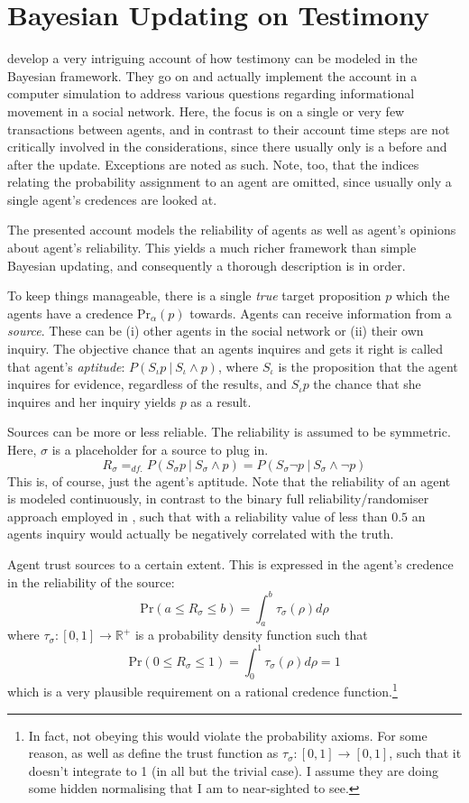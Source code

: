 \documentclass[11pt, a4paper]{scrartcl}
\newcommand{\Ss}{S_{\sigma}}
\newcommand{\given}[1][]{\:#1\vert\:}
\renewcommand{\Pr}{\text{Pr}}
\renewcommand{\i}[1]{\emph{#1}}
\begin{document}
\section{Bayesian Updating on Testimony}

\textcite{Olsson2013} develop a very intriguing account of how testimony can be modeled in the Bayesian framework. They go on and actually implement the account in a computer simulation to address various questions regarding informational movement in a social network. Here, the focus is on a single or very few transactions between agents, and in contrast to their account time steps are not critically involved in the considerations, since there usually only is a before and after the update. Exceptions are noted as such. Note, too, that the indices relating the probability assignment to an agent are omitted, since usually only a single agent's credences are looked at.   

The presented account models the reliability of agents as well as agent's opinions about agent's reliability. This yields a much richer framework than simple Bayesian updating, and consequently a thorough description is in order.

To keep things manageable, there is a single \i{true} target proposition $p$ which the agents have a credence $\Pr_\alpha(p)$ towards. Agents can receive information from a \i{source}. These can be (i) other agents in the social network or (ii) their own inquiry. The objective chance that an agents inquires and gets it right is called that agent's \i{aptitude}: $P(S_{\iota}p \given S_{\iota} \land p)$, where $S_{\iota}$ is the proposition that the agent inquires for evidence, regardless of the results, and $S_{\iota} p$ the chance that she inquires and her inquiry yields $p$ as a result. 

Sources can be more or less reliable. The reliability is assumed to be symmetric. Here, $\sigma$ is a placeholder for a source to plug in. 
\[ 
R_{\sigma} =_{df.} P(\Ss p \given \Ss \land p) = P(\Ss \neg p \given \Ss \land \neg p)
\]
This is, of course, just the agent's aptitude. Note that the reliability of an agent is modeled continuously, in contrast to the binary full reliability/randomiser approach employed in \textcite[Chp. 3]{Bovens2003}, such that with a reliability value of less than $0.5$ an agents inquiry would actually be negatively correlated with the truth.

Agent trust sources to a certain extent. This is expressed in the agent's credence in the reliability of the source:
\[ 
    \Pr(a \leqslant R_{\sigma} \leqslant b) = \int_a^b \tau_{\sigma}(\rho) d\rho
\]
where $\tau_{\sigma}: [0,1] \rightarrow \mathbb{R}^+$ is a probability density function such that 
\[
    \Pr(0 \leqslant R_{\sigma} \leqslant 1) =  \int_0^1 \tau_{\sigma} (\rho) d\rho = 1
\]which is a very plausible requirement on a rational credence function.\footnote{In fact, not obeying this would violate the probability axioms. For some reason, \textcite{Angere2010} as well as \textcite{Olsson2013} define the trust function as $\tau_{\sigma}: [0,1] \rightarrow [0,1]$, such that it doesn't integrate to 1 (in all but the trivial case). I assume they are doing some hidden normalising that I am to near-sighted to see.}
\end{document}
